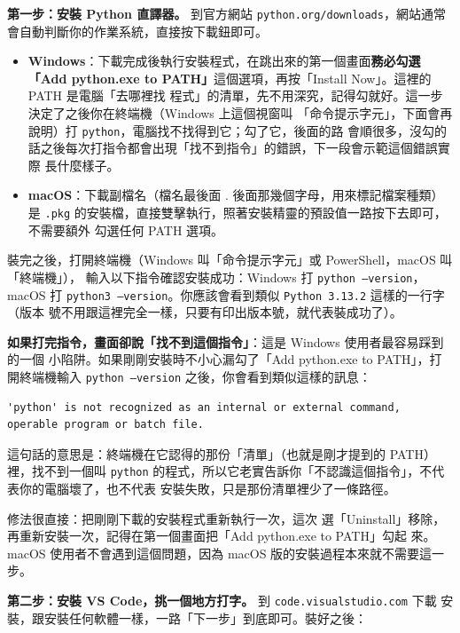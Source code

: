 \textbf{第一步：安裝 Python 直譯器。} 到官方網站 \texttt{python.org/downloads}，網站通常
會自動判斷你的作業系統，直接按下載鈕即可。

\begin{itemize}
\item \textbf{Windows}：下載完成後執行安裝程式，在跳出來的第一個畫面\textbf{務必勾選
「Add python.exe to PATH」}這個選項，再按「Install Now」。這裡的 PATH 是電腦「去哪裡找
程式」的清單，先不用深究，記得勾就好。這一步決定了之後你在終端機（Windows 上這個視窗叫
「命令提示字元」，下面會再說明）打 \texttt{python}，電腦找不找得到它；勾了它，後面的路
會順很多，沒勾的話之後每次打指令都會出現「找不到指令」的錯誤，下一段會示範這個錯誤實際
長什麼樣子。
\item \textbf{macOS}：下載副檔名（檔名最後面 . 後面那幾個字母，用來標記檔案種類）是
\texttt{.pkg} 的安裝檔，直接雙擊執行，照著安裝精靈的預設值一路按下去即可，不需要額外
勾選任何 PATH 選項。
\end{itemize}

裝完之後，打開終端機（Windows 叫「命令提示字元」或 PowerShell，macOS 叫「終端機」），
輸入以下指令確認安裝成功：Windows 打 \texttt{python --version}，macOS 打
\texttt{python3 --version}。你應該會看到類似 \texttt{Python 3.13.2} 這樣的一行字（版本
號不用跟這裡完全一樣，只要有印出版本號，就代表裝成功了）。

\textbf{如果打完指令，畫面卻說「找不到這個指令」}：這是 Windows 使用者最容易踩到的一個
小陷阱。如果剛剛安裝時不小心漏勾了「Add python.exe to PATH」，打開終端機輸入
\texttt{python --version} 之後，你會看到類似這樣的訊息：

\begin{verbatim}
'python' is not recognized as an internal or external command,
operable program or batch file.
\end{verbatim}

這句話的意思是：終端機在它認得的那份「清單」（也就是剛才提到的 PATH）裡，找不到一個叫
\texttt{python} 的程式，所以它老實告訴你「不認識這個指令」，不代表你的電腦壞了，也不代表
安裝失敗，只是那份清單裡少了一條路徑。

修法很直接：把剛剛下載的安裝程式重新執行一次，這次
選「Uninstall」移除，再重新安裝一次，記得在第一個畫面把「Add python.exe to PATH」勾起
來。macOS 使用者不會遇到這個問題，因為 macOS 版的安裝過程本來就不需要這一步。

\textbf{第二步：安裝 VS Code，挑一個地方打字。} 到 \texttt{code.visualstudio.com} 下載
安裝，跟安裝任何軟體一樣，一路「下一步」到底即可。裝好之後：

